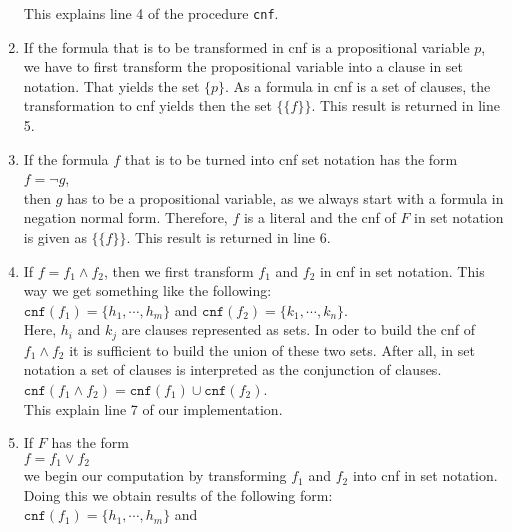 \begin{enumerate}
      This explains line 4 of the procedure \texttt{cnf}.
\item If the formula that is to be transformed in cnf is a propositional variable $p$,
      we have to first transform the propositional variable into a clause in set notation.
      That yields the set $\{p\}$.  As a formula in cnf is a set of clauses, the transformation
      to cnf yields then the set  $\bigl\{\{f\}\bigr\}$.
      This result is returned in line  5.
\item If the formula  $f$ that is to be turned into cnf set notation has the form \\[0.2cm]
      \hspace*{1.3cm} $f = \neg g$, \\[0.2cm]
      then $g$ has to be a propositional variable, as we always start with a formula in negation
      normal form.   Therefore, $f$ is a literal and the cnf of $F$ in set notation is given as  
      $\bigl\{\{f\}\bigr\}$.  This result is returned in line 6.
\item If $f= f_1 \wedge f_2$, then we first transform  $f_1$ and $f_2$ in cnf in set notation.
      This way we get something like the following: \\[0.2cm]
      \hspace*{1.3cm} 
      $\mathtt{cnf}(f_1) = \{ h_1, \cdots, h_m \}$ \quad and \quad
      $\mathtt{cnf}(f_2) = \{ k_1, \cdots, k_n \}$. \\[0.2cm]
      Here,  $h_i$ and $k_j$ are clauses represented as sets.  In oder to build the  cnf of $f_1 \wedge f_2$ 
      it is sufficient to build the union of these two sets.  After all, in set notation a set of
      clauses is interpreted as the conjunction of clauses.
      \\[0.2cm]
      \hspace*{1.3cm} $\mathtt{cnf}(f_1 \wedge f_2) = \mathtt{cnf}(f_1) \cup  \mathtt{cnf}(f_2)$.
      \\[0.2cm]
      This explain line  7 of our implementation.
\item If $F$ has the form 
      \\[0.2cm]
      \hspace*{1.3cm}
      $f= f_1 \vee f_2$ 
      \\[0.2cm]
      we begin our computation by transforming  $f_1$ and $f_2$ into  cnf in set notation.
      Doing this we obtain results of the following form: \\[0.2cm]
      \hspace*{1.3cm} 
      $\mathtt{cnf}(f_1) = \{ h_1, \cdots, h_m \}$ \quad and \quad

\end{enumerate}
